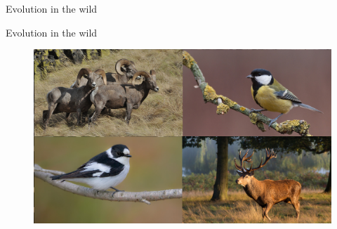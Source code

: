 \documentclass[10pt]{beamer}%
\begin{document}
\begin{frame}%
\end{frame}

\begin{frame}{Evolution in the wild}

\end{frame}

\begin{frame}{Evolution in the wild}
	\begin{figure}
		\includegraphics[width=\textwidth]{Figures/Wild}
	\end{figure}
\end{frame} %

\end{document}
